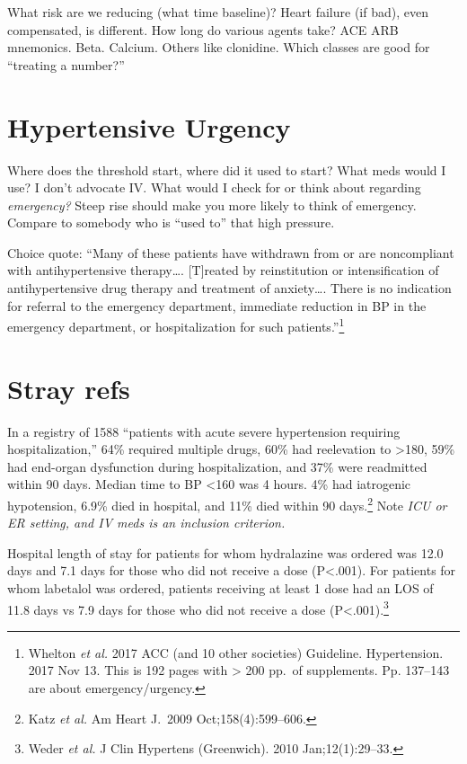 \documentclass{tufte-handout}
\begin{document}
What risk are we reducing (what time baseline)? Heart failure (if
bad), even compensated, is different. How long do various agents take?
ACE ARB mnemonics. Beta. Calcium. Others like clonidine. Which classes
are good for ``treating a number?''

 

\section{Hypertensive Urgency}

Where does the threshold start, where did it used to start? What meds
would I use? I don't advocate IV. What would I check for or think
about regarding \emph{emergency?} Steep rise should make you more
likely to think of emergency. Compare to somebody who is ``used to''
that high pressure.

Choice quote: ``Many of these patients have withdrawn from or are
noncompliant with antihypertensive therapy\ldots{}. [T]reated by
reinstitution or intensification of antihypertensive drug therapy and
treatment of anxiety\ldots{}. There is no indication for referral to
the emergency department, immediate reduction in BP in the emergency
department, or hospitalization for such patients.''\footnote{Whelton
  \emph{et al.} 2017 ACC (and 10 other societies) Guideline. Hypertension.
  2017 Nov 13. This is 192 pages with > 200 pp.\ of supplements. Pp.
  137--143 are about emergency/urgency.}



\section{Stray refs}

In a registry of 1588 ``patients with acute severe hypertension
requiring hospitalization,'' 64\% required multiple drugs, 60\% had
reelevation to >180, 59\% had end-organ dysfunction during
hospitalization, and 37\% were readmitted within 90 days. Median time
to BP <160 was 4 hours. 4\% had iatrogenic hypotension, 6.9\% died in
hospital, and 11\% died within 90 days.\footnote{Katz \emph{et al.} Am Heart
  J.\ 2009 Oct;158(4):599--606.} Note \emph{ICU or ER setting, and IV
  meds is an inclusion criterion.}

Hospital length of stay for patients for whom hydralazine was ordered
was 12.0 days and 7.1 days for those who did not receive a dose
(P<.001). For patients for whom labetalol was ordered, patients
receiving at least 1 dose had an LOS of 11.8 days vs 7.9 days for
those who did not receive a dose (P<.001).\footnote{Weder \emph{et al.} J
  Clin Hypertens (Greenwich). 2010 Jan;12(1):29--33. }
\end{document}

